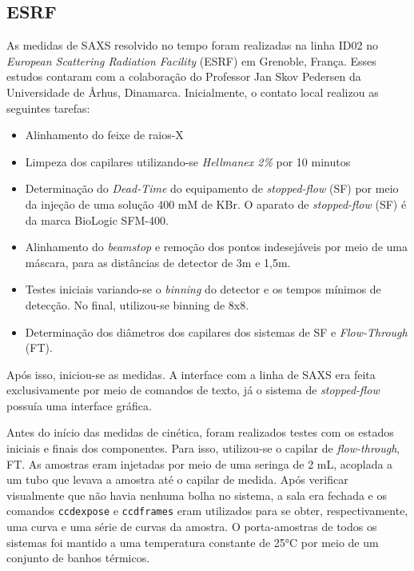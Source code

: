 			\subsection{ESRF}
			As medidas de SAXS resolvido no tempo foram realizadas na linha ID02 no \emph{European Scattering Radiation Facility} (ESRF) em Grenoble, França. Esses estudos contaram com a colaboração do Professor Jan Skov Pedersen da Universidade de \AA rhus, Dinamarca. Inicialmente, o contato local realizou as seguintes tarefas:
			
			\begin{itemize}
				\item Alinhamento do feixe de raios-X
				\item Limpeza dos capilares utilizando-se \emph{Hellmanex 2\%} por 10 minutos
				\item Determinação do \emph{Dead-Time} do equipamento de \emph{stopped-flow} (SF) por meio da injeção de uma solução 400 mM de KBr. O aparato de \emph{stopped-flow} (SF) é da marca BioLogic SFM-400.
				\item Alinhamento do \emph{beamstop} e remoção dos pontos indesejáveis por meio de uma máscara, para as distâncias de detector de 3m e 1,5m.
				\item Testes iniciais variando-se o \emph{binning} do detector e os tempos mínimos de detecção. No final, utilizou-se binning de 8x8.
				\item Determinação dos diâmetros dos capilares dos sistemas de SF e \emph{Flow-Through} (FT).
			\end{itemize}
			
			Após isso, iniciou-se as medidas. A interface com a linha de SAXS era feita exclusivamente por meio de comandos de texto, já o sistema de \emph{stopped-flow} possuía uma interface gráfica.
			
			Antes do início das medidas de cinética, foram realizados testes com os estados iniciais e finais dos componentes. Para isso, utilizou-se o capilar de \emph{flow-through}, FT. As amostras eram injetadas por meio de uma seringa de 2 mL, acoplada a um tubo que levava a amostra até o capilar de medida. Após verificar visualmente que não havia nenhuma bolha no sistema, a sala era fechada e os comandos \texttt{ccdexpose} e \texttt{ccdframes} eram utilizados para se obter, respectivamente, uma curva e uma série de curvas da amostra. O porta-amostras de todos os sistemas foi mantido a uma temperatura constante de 25°C por meio de um conjunto de banhos térmicos.
			
